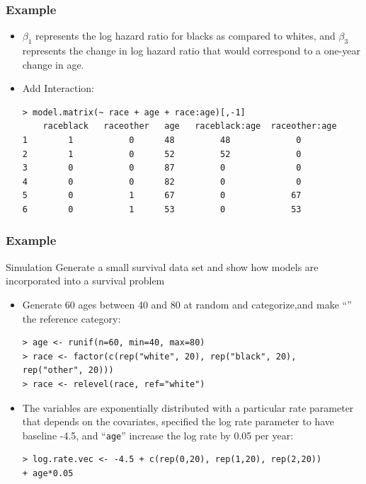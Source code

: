 \documentclass{beamer}
\begin{document}
\pagebreak
\begin{frame}[fragile]
\frametitle{Example}	
\begin{itemize}
\item $\beta_1$ represents the log hazard ratio for blacks as compared to whites, and $\beta_3$ represents the change in log hazard ratio that would correspond to a one-year change in age.
\item Add {\color{red}Interaction}:
\begin{Verbatim}
> model.matrix(~ race + age + race:age)[,-1]
    raceblack   raceother   age   raceblack:age  raceother:age
1        1           0      48         48             0
2        1           0      52         52             0
3        0           0      87         0              0
4        0           0      82         0              0
5        0           1      67         0             67
6        0           1      53         0             53
\end{Verbatim}
\end{itemize}
\end{frame}


\pagebreak
\begin{frame}[fragile]
\frametitle{Example}	
\begin{problock}{Simulation}
Generate a small survival data set and show how models are incorporated into a survival problem
\end{problock}
\begin{itemize}
\item Generate 60 ages between 40 and 80 at random and categorize,and make ``'' the reference category:
\begin{Verbatim}
> age <- runif(n=60, min=40, max=80)
> race <- factor(c(rep("white", 20), rep("black", 20), 
rep("other", 20)))
> race <- relevel(race, ref="white")
\end{Verbatim}
\item The variables are exponentially distributed with a particular rate parameter that depends on the covariates, specified the log rate parameter to have baseline -4.5, and ``\texttt{age}'' increase the log rate by 0.05 per year:
\begin{Verbatim}
> log.rate.vec <- -4.5 + c(rep(0,20), rep(1,20), rep(2,20)) 
+ age*0.05
\end{Verbatim}
\end{itemize}
\end{frame}
\end{document}
